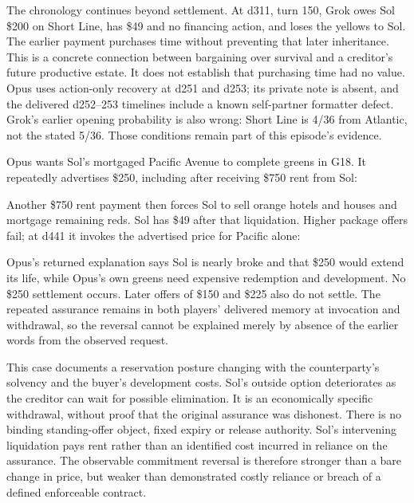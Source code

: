 The chronology continues beyond settlement. At d311, turn 150, Grok owes Sol \$200 on Short Line, has \$49 and no financing action, and loses the yellows to Sol. The earlier payment purchases time without preventing that later inheritance. This is a concrete connection between bargaining over survival and a creditor's future productive estate. It does not establish that purchasing time had no value. Opus uses action-only recovery at d251 and d253; its private note is absent, and the delivered d252--253 timelines include a known self-partner formatter defect. Grok's earlier opening probability is also wrong: Short Line is 4/36 from Atlantic, not the stated 5/36. Those conditions remain part of this episode's evidence.


Opus wants Sol's mortgaged Pacific Avenue to complete greens in G18. It repeatedly advertises \$250, including after receiving \$750 rent from Sol:


Another \$750 rent payment then forces Sol to sell orange hotels and houses and mortgage remaining reds. Sol has \$49 after that liquidation. Higher package offers fail; at d441 it invokes the advertised price for Pacific alone:


Opus's returned explanation says Sol is nearly broke and that \$250 would extend its life, while Opus's own greens need expensive redemption and development. No \$250 settlement occurs. Later offers of \$150 and \$225 also do not settle. The repeated assurance remains in both players' delivered memory at invocation and withdrawal, so the reversal cannot be explained merely by absence of the earlier words from the observed request.

This case documents a reservation posture changing with the counterparty's solvency and the buyer's development costs. Sol's outside option deteriorates as the creditor can wait for possible elimination. It is an economically specific withdrawal, without proof that the original assurance was dishonest. There is no binding standing-offer object, fixed expiry or release authority. Sol's intervening liquidation pays rent rather than an identified cost incurred in reliance on the assurance. The observable commitment reversal is therefore stronger than a bare change in price, but weaker than demonstrated costly reliance or breach of a defined enforceable contract.

